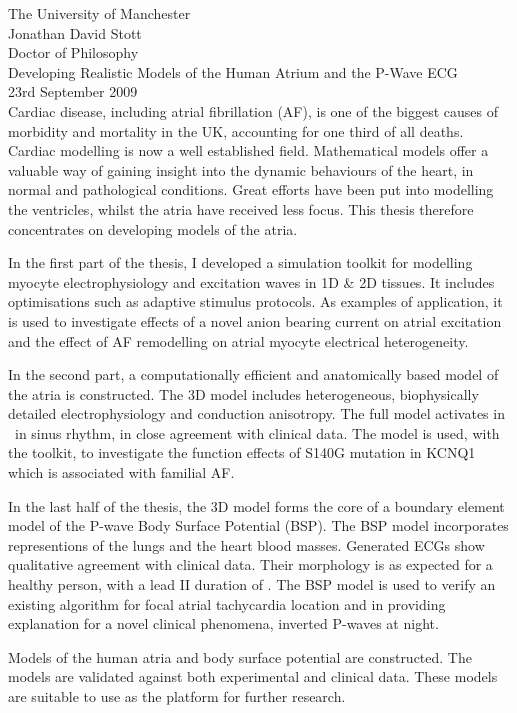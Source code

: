 The University of Manchester\\
Jonathan David Stott\\
Doctor of Philosophy\\
Developing Realistic Models of the Human Atrium and the P-Wave ECG\\
23rd September 2009\\

Cardiac disease, including atrial fibrillation (AF), is one of the biggest causes of
morbidity and mortality in the UK, accounting for one third of all
deaths.
Cardiac modelling is now a well established field.
Mathematical models offer a valuable way of gaining insight into the dynamic
behaviours of the heart, in normal and pathological conditions.
Great efforts have been put into modelling the ventricles, whilst the atria have
received less focus.
This thesis therefore concentrates on developing models of the atria.

In the first part of the thesis, I developed a simulation toolkit for
modelling myocyte electrophysiology and excitation waves in 1D \& 2D
tissues.
It includes optimisations such as adaptive stimulus protocols.
As examples of application, it is used to investigate effects of a novel anion
bearing current on atrial excitation and the effect of AF remodelling on atrial
myocyte electrical heterogeneity.

In the second part, a computationally efficient and anatomically based model of
the atria is constructed.
The 3D model includes heterogeneous, biophysically detailed
electrophysiology and conduction anisotropy.
The full model activates in \ in sinus rhythm, in
close agreement with clinical data.
The model is used, with the toolkit, to investigate the function effects of S140G
mutation in KCNQ1 which is associated with familial AF.

In the last half of the thesis, the 3D model forms the core of a boundary
element model of the P-wave Body Surface Potential (BSP).
The BSP model incorporates representions of the lungs and the heart blood masses.
Generated ECGs show qualitative agreement with clinical data.
Their morphology is as expected for a healthy person, with a lead II duration of
.
The BSP model is used to verify an existing algorithm for focal atrial
tachycardia location and in providing explanation for a novel clinical
phenomena, inverted P-waves at night.


Models of the human atria and body surface potential are constructed.
The models are validated against both experimental and clinical data.
These models are suitable to use as the platform for further research.


